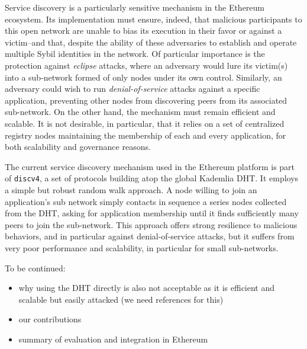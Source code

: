 Service discovery is a particularly sensitive mechanism in the Ethereum ecosystem.
Its implementation must ensure, indeed, that malicious participants to this open network are unable to bias its execution in their favor or against a victim--and that, despite the ability of these adversaries to establish and operate multiple Sybil identities in the network.
Of particular importance is the protection against \emph{eclipse} attacks, where an adversary would lure its victim(s) into a sub-network formed of only nodes under its own control. %
Similarly, an adversary could wish to run \emph{denial-of-service} attacks against a specific application, preventing other nodes from discovering peers from its associated sub-network.
On the other hand, the mechanism must remain efficient and scalable.
It is not desirable, in particular, that it relies on a set of centralized registry nodes maintaining the membership of each and every application, for both scalability and governance reasons.

The current service discovery mechanism used in the Ethereum platform is part of \texttt{discv4}, a set of protocols building atop the global Kademlia DHT.
It employs a simple but robust random walk approach.
A node willing to join an application's sub network simply contacts in sequence a series nodes collected from the DHT, asking for application membership until it finds sufficiently many peers to join the sub-network.
This approach offers strong resilience to malicious behaviors, and in particular against denial-of-service attacks, but it suffers from very poor performance and scalability, in particular for small sub-networks.

To be continued:
\begin{itemize}
  \item why using the DHT directly is also not acceptable as it is efficient and scalable but easily attacked (we need references for this)
  \item our contributions
  \item summary of evaluation and integration in Ethereum
\end{itemize}
